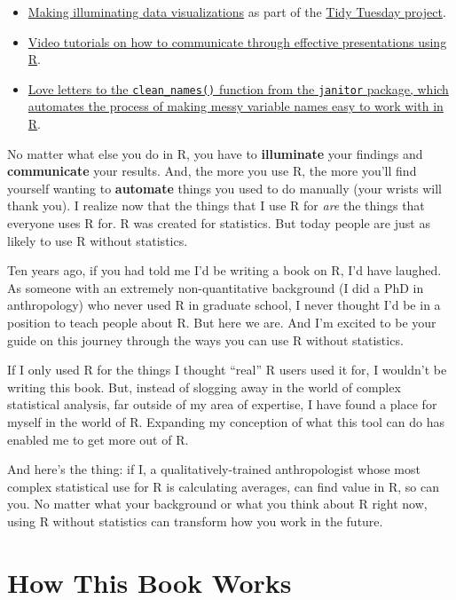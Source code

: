 \documentclass[
]{book}
\begin{document}
\begin{itemize}
\item
  \href{https://twitter.com/CedScherer/status/1220843943224578050}{Making illuminating data visualizations} as part of the \href{https://github.com/rfordatascience/tidytuesday}{Tidy Tuesday project}.
\item
  \href{https://twitter.com/spcanelon/status/1424932510065209348}{Video tutorials on how to communicate through effective presentations using R}.
\item
  \href{https://twitter.com/WeAreRLadies/status/1228049014601342976}{Love letters to the \texttt{clean\_names()} function from the \texttt{janitor} package, which automates the process of making messy variable names easy to work with in R}.
\end{itemize}

No matter what else you do in R, you have to \textbf{illuminate} your findings and \textbf{communicate} your results. And, the more you use R, the more you'll find yourself wanting to \textbf{automate} things you used to do manually (your wrists will thank you). I realize now that the things that I use R for \emph{are} the things that everyone uses R for. R was created for statistics. But today people are just as likely to use R without statistics.

Ten years ago, if you had told me I'd be writing a book on R, I'd have laughed. As someone with an extremely non-quantitative background (I did a PhD in anthropology) who never used R in graduate school, I never thought I'd be in a position to teach people about R. But here we are. And I'm excited to be your guide on this journey through the ways you can use R without statistics.

If I only used R for the things I thought ``real'' R users used it for, I wouldn't be writing this book. But, instead of slogging away in the world of complex statistical analysis, far outside of my area of expertise, I have found a place for myself in the world of R. Expanding my conception of what this tool can do has enabled me to get more out of R.

And here's the thing: if I, a qualitatively-trained anthropologist whose most complex statistical use for R is calculating averages, can find value in R, so can you. No matter what your background or what you think about R right now, using R without statistics can transform how you work in the future.

\hypertarget{how-this-book-works}{%
\section*{How This Book Works}\label{how-this-book-works}}
\end{document}
